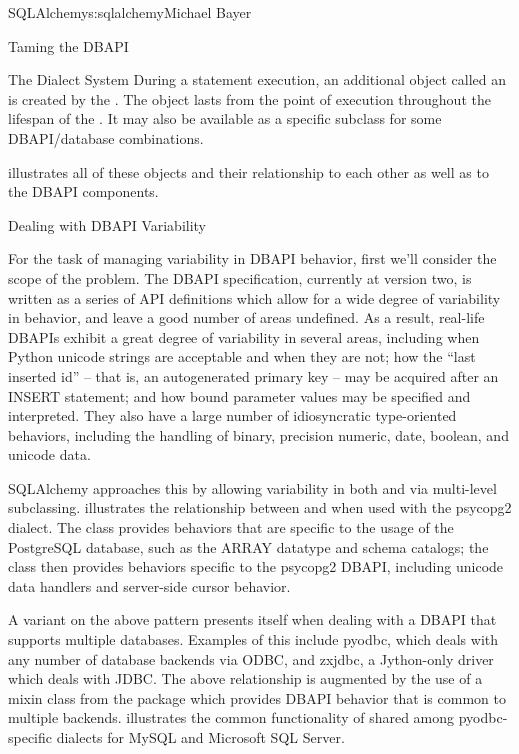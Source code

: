 \begin{aosachapter}{SQLAlchemy}{s:sqlalchemy}{Michael Bayer}
\begin{aosasect1}{Taming the DBAPI}
\begin{aosasect2}{The Dialect System}
During a statement execution, an additional object called an
 is created by the . The object lasts from the
point of execution throughout the lifespan of the . It
may also be available as a specific subclass for some DBAPI/database
combinations.

 illustrates all of these objects and their relationship to each
other as well as to the DBAPI components.


\end{aosasect2}

\begin{aosasect2}{Dealing with DBAPI Variability}

For the task of managing variability in DBAPI behavior,
first we'll consider the scope of the problem. The DBAPI
specification, currently at version two, is written as a series of
API definitions which allow for a wide degree of variability in
behavior, and leave a good number of areas undefined.  As a result, real-life
DBAPIs exhibit a great degree of variability
in several areas, including when Python
unicode strings are acceptable and when they are not; how the
``last inserted id'' – that is, an autogenerated primary key – may be
acquired after an INSERT statement; and how bound parameter values
may be specified and interpreted. They also have a large number of idiosyncratic type-oriented
behaviors, including the handling of binary, precision numeric, date,
boolean, and unicode data.

SQLAlchemy approaches this by allowing variability in both  and
 via multi-level subclassing.    illustrates
the relationship between  and  when
used with the psycopg2 dialect.  The  class provides behaviors that
are specific to the usage of the PostgreSQL database, such as the ARRAY datatype
and schema catalogs; the 
class then provides behaviors specific to the psycopg2 DBAPI, including
unicode data handlers and server-side cursor behavior.


A variant on the above pattern presents itself when dealing with a DBAPI
that supports multiple databases.   Examples of this include
pyodbc, which deals with any number of database backends via ODBC,
and zxjdbc, a Jython-only driver which deals with JDBC.   The above
relationship is augmented by the use of a mixin class from the
 package which provides DBAPI behavior that
is common to multiple backends.   illustrates the common
functionality of  shared among
pyodbc-specific dialects for MySQL and Microsoft SQL Server.


\end{aosasect2}
\end{aosasect1}
\end{aosachapter}
